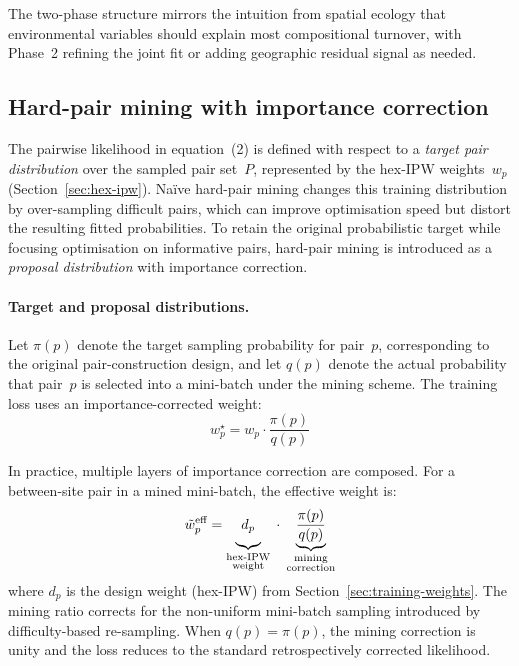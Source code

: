 \documentclass{article}
\begin{document}
The two-phase structure mirrors the intuition from spatial ecology that environmental variables should explain most compositional turnover, with Phase~2 refining the joint fit or adding geographic residual signal as needed.

\subsection{Hard-pair mining with importance correction}
\label{sec:hard-mining}

The pairwise likelihood in equation~(2) is defined with respect to a \emph{target pair distribution} over the sampled pair set~$P$, represented by the hex-IPW weights~$w_p$ (Section~\ref{sec:hex-ipw}). Na\"ive hard-pair mining changes this training distribution by over-sampling difficult pairs, which can improve optimisation speed but distort the resulting fitted probabilities. To retain the original probabilistic target while focusing optimisation on informative pairs, hard-pair mining is introduced as a \emph{proposal distribution} with importance correction.

\paragraph{Target and proposal distributions.}
Let $\pi(p)$ denote the target sampling probability for pair~$p$, corresponding to the original pair-construction design, and let $q(p)$ denote the actual probability that pair~$p$ is selected into a mini-batch under the mining scheme. The training loss uses an importance-corrected weight:
\begin{equation}
    w_p^\star = w_p \cdot \frac{\pi(p)}{q(p)}
\end{equation}

In practice, multiple layers of importance correction are composed. For a between-site pair in a mined mini-batch, the effective weight is:
\begin{equation}
    \tilde{w}_p^{\text{eff}} = \underbrace{d_p\vphantom{\frac{1}{\alpha_h}}}_{\substack{\text{hex-IPW}\\\text{weight}}} \;\cdot\; \underbrace{\frac{\pi(p)}{q(p)}}_{\substack{\text{mining}\\\text{correction}}}
\end{equation}
where $d_p$ is the design weight (hex-IPW) from Section~\ref{sec:training-weights}. The mining ratio corrects for the non-uniform mini-batch sampling introduced by difficulty-based re-sampling. When $q(p) = \pi(p)$, the mining correction is unity and the loss reduces to the standard retrospectively corrected likelihood.
\end{document}
